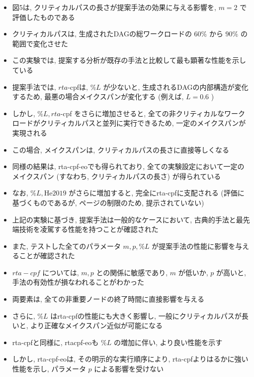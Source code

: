 \begin{frame}{}
    \begin{itemize}
        \item 図5は, クリティカルパスの長さが提案手法の効果に与える影響を, $m=2$ で評価したものである
\item クリティカルパスは, 生成されたDAGの総ワークロードの $60 \%$ から $90 \%$ の範囲で変化させた
\item この実験では, 提案する分析が既存の手法と比較して最も顕著な性能を示している
    \end{itemize}
\end{frame}

\begin{frame}{}
    \begin{itemize}
        \item 提案手法では, $r t a$-cpfは, $\% L$ が少ないと, 生成されるDAGの内部構造が変化するため, 最悪の場合メイクスパンが変化する (例えば, $L=0.6$ )
\item しかし, $\% L, r t a$-cpf をさらに増加させると, 全ての非クリティカルなワークロードがクリティカルパスと並列に実行できるため, 一定のメイクスパンが実現される
\item この場合, メイクスパンは, クリティカルパスの長さに直接等しくなる
\item 同様の結果は, rta-cpf-eoでも得られており, 全ての実験設定において一定のメイクスパン (すなわち, クリティカルパスの長さ) が得られている
\item なお, $\% L, \mathrm{He} 2019$ がさらに増加すると, 完全にrta-cpfに支配される (評価に基づくものであるが, ページの制限のため, 提示されていない) 
    \end{itemize}
\end{frame}

\begin{frame}{}
    \begin{itemize}
        \item 上記の実験に基づき, 提案手法は一般的なケースにおいて, 古典的手法と最先端技術を凌駕する性能を持つことが確認された
\item また, テストした全てのパラメータ $m, p, \% L$ が提案手法の性能に影響を与えることが確認された
\item $r t a-c p f$ については, $m, p$ との関係に敏感であり, $m$ が低いか, $p$ が高いと, 手法の有効性が損なわれることがわかった
\item 両要素は, 全ての非重要ノードの終了時間に直接影響を与える
\item さらに, $\% L$ はrta-cpfの性能にも大きく影響し, 一般にクリティカルパスが長いと, より正確なメイクスパン近似が可能になる
\item rta-cpfと同様に, rtacpf-eoも $\% L$ の増加に伴い, より良い性能を示す
\item しかし, rta-cpf-eoは, その明示的な実行順序により, rta-cpfよりはるかに強い性能を示し, パラメータ $p$ による影響を受けない
    \end{itemize}
\end{frame}


